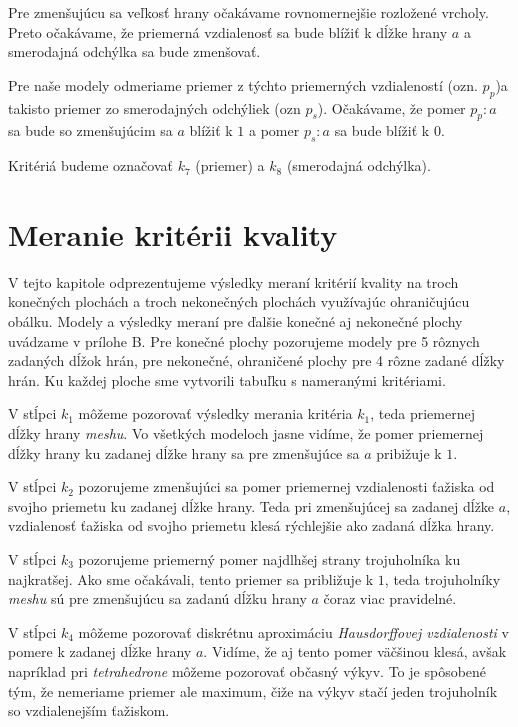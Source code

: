 \begin{enumerate}
{    Pre zmenšujúcu sa veľkosť hrany očakávame rovnomernejšie rozložené vrcholy. Preto očakávame, že 
    priemerná vzdialenosť sa bude blížiť k dĺžke hrany $a$ a smerodajná odchýlka sa bude zmenšovať.
    
    Pre naše modely odmeriame priemer z týchto priemerných vzdialeností (ozn. $p_p$)a takisto priemer 
    zo smerodajných odchýliek (ozn $p_s$). Očakávame, že pomer $p_p : a$ sa bude so zmenšujúcim sa $a$
    blížiť k $1$ a pomer $p_s : a$ sa bude blížiť k $0$.

    Kritériá budeme označovať $k_7$ (priemer) a $k_8$ (smerodajná odchýlka).
}
\end{enumerate}

\section{Meranie kritérii kvality}

V tejto kapitole odprezentujeme výsledky meraní kritérií kvality na troch konečných plochách
a troch nekonečných plochách využívajúc ohraničujúcu obálku. Modely a výsledky meraní pre ďalšie
konečné aj nekonečné plochy uvádzame v prílohe B.
Pre konečné plochy pozorujeme modely pre 5 rôznych zadaných dĺžok hrán, pre nekonečné, ohraničené plochy pre
4 rôzne zadané dĺžky hrán. Ku každej ploche sme vytvorili tabuľku s nameranými kritériami. 

V stĺpci $k_1$ môžeme pozorovať výsledky merania kritéria $k_1$, teda priemernej dĺžky hrany \textit{meshu}. 
Vo všetkých modeloch jasne vidíme, 
že pomer priemernej dĺžky hrany ku zadanej dĺžke hrany sa pre zmenšujúce sa $a$ pribižuje k $1$.

V stĺpci $k_2$ pozorujeme zmenšujúci sa pomer priemernej vzdialenosti ťažiska od svojho priemetu ku 
zadanej dĺžke hrany. Teda pri zmenšujúcej sa zadanej dĺžke $a$, vzdialenosť ťažiska od svojho priemetu 
klesá rýchlejšie ako zadaná dĺžka hrany.

V stĺpci $k_3$ pozorujeme priemerný pomer najdlhšej strany trojuholníka ku najkratšej. Ako sme očakávali,
tento priemer sa približuje k $1$, teda trojuholníky \textit{meshu} sú pre zmenšujúcu sa zadanú dĺžku hrany
$a$ čoraz viac pravidelné.

V stĺpci $k_4$ môžeme pozorovať diskrétnu aproximáciu \textit{Hausdorffovej vzdialenosti} v pomere k zadanej dĺžke 
hrany $a$. Vidíme, že aj tento pomer väčšinou klesá, avšak napríklad pri \textit{tetrahedrone} môžeme 
pozorovať občasný výkyv. To je spôsobené tým, že nemeriame priemer ale maximum, čiže na výkyv stačí jeden 
trojuholník so vzdialenejším ťažiskom. 

